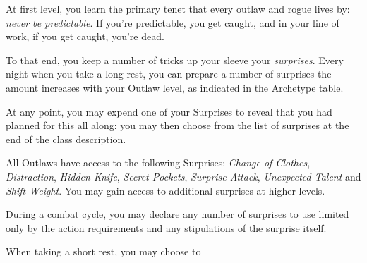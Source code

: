 
At first level, you learn the primary tenet that every outlaw and rogue lives by: {\it never be predictable}. If you're predictable, you get caught, and in your line of work, if you get caught, you're dead.

To that end, you keep a number of tricks up your sleeve \minus{} your {\it surprises}. Every night when you take a long rest, you can prepare a number of surprises \minus{} the amount increases with your Outlaw level, as indicated in the Archetype table. 

At any point, you may expend one of your Surprises to reveal that you had planned for this all along: you may then choose from the list of surprises at the end of the class description. 

All Outlaws have access to the following Surprises: {\it Change of Clothes}, {\it Distraction}, {\it Hidden Knife}, {\it Secret Pockets}, {\it Surprise Attack}, {\it Unexpected Talent} and {\it Shift Weight}. You may gain access to additional surprises at higher levels. 

During a combat cycle, you may declare any number of surprises to use \minus{} limited only by the action requirements and any stipulations of the surprise itself. 



When taking a short rest, you may choose to 

